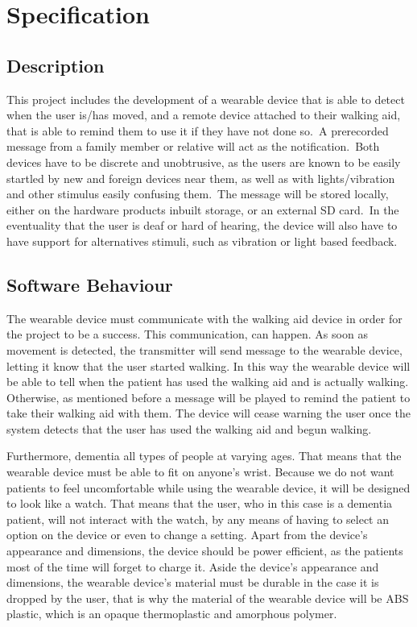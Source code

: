 \chapter{Specification}\label{ch:specification}
    \section{Description}

        This project includes the development of a wearable device that is able to detect when the user is/has moved,
        and a remote device attached to their walking aid, that is able to remind them to use it if they have not done
        so.\ A prerecorded message from a family member or relative will act as the notification.\ Both devices have to
        be discrete and unobtrusive, as the users are known to be easily startled by new and foreign devices near them,
        as well as with lights/vibration and other stimulus easily confusing them.\ The message will be stored locally,
        either on the hardware products inbuilt storage, or an external SD card.\ In the eventuality that the user is
        deaf or hard of hearing, the device will also have to have support for alternatives stimuli, such as vibration
        or light based feedback.

    \section{Software Behaviour}

        The wearable device must communicate with the walking aid device in order for the project to be a success. This
        communication, can happen. As soon as movement is detected, the transmitter will
        send message to the wearable device, letting it know that the user started walking. In this way the wearable
        device will be able to tell when the patient has used the walking aid and is actually walking. Otherwise, as
        mentioned before a message will be played to remind the patient to take their walking aid with them. The device
        will cease warning the user once the system detects that the user has used the walking aid and begun walking.

        Furthermore, dementia all types of people at varying ages. That means that the wearable device must be able to
        fit on anyone's wrist. Because we do not want patients to feel uncomfortable while using the wearable device, it
        will be designed to look like a watch. That means that the user, who in this case is a dementia patient, will
        not interact with the watch, by any means of having to select an option on the device or even to change a
        setting. Apart from the device's appearance and dimensions, the device should be power efficient, as the
        patients most of the time will forget to charge it. Aside the device's appearance and dimensions, the wearable device's material must be durable in the case it is dropped by the user, that is why the material of the wearable device will be ABS plastic, which is an opaque thermoplastic and amorphous polymer.

